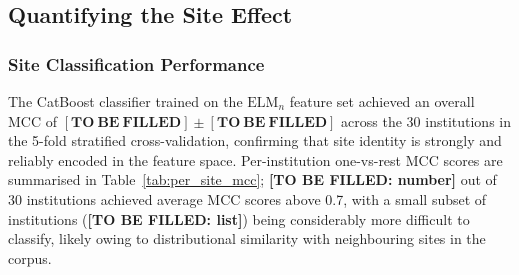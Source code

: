 \documentclass[preprint,12pt]{elsarticle}
\begin{document}
\subsection{Quantifying the Site Effect}
\label{subsec:site_classification}

\subsubsection{Site Classification Performance}

The CatBoost classifier trained on the $\mathrm{ELM}_n$ feature set
achieved an overall MCC of $\mathbf{[TO\ BE\ FILLED]} \pm
\mathbf{[TO\ BE\ FILLED]}$ across the 30 institutions in the 5-fold
stratified cross-validation, confirming that site identity is
strongly and reliably encoded in the feature space.
Per-institution one-vs-rest MCC scores are summarised in
Table~\ref{tab:per_site_mcc}; \textbf{[TO BE FILLED: number]} out of
30 institutions achieved average MCC scores above 0.7, with a small
subset of institutions (\textbf{[TO BE FILLED: list]}) being
considerably more difficult to classify, likely owing to distributional
similarity with neighbouring sites in the corpus.
\end{document}
